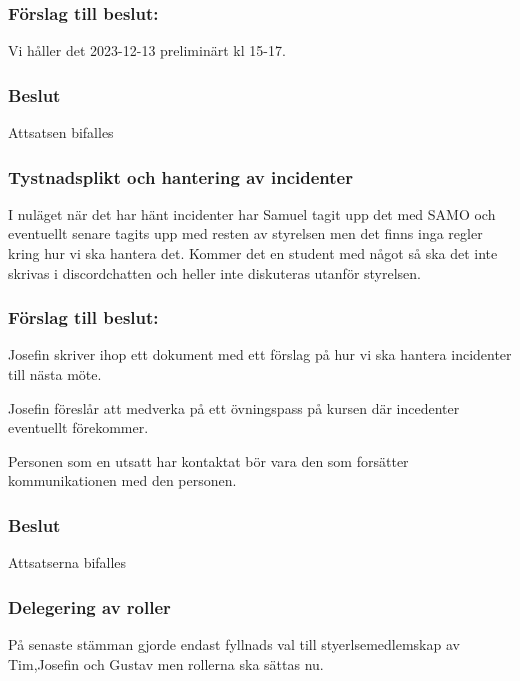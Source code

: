 \documentclass[protokoll]{dvd}
\begin{document}
\subsubsection*{Förslag till beslut:}
\begin{attsatser}
    \item Vi håller det 2023-12-13 preliminärt kl 15-17.
\end{attsatser}

\subsubsection*{Beslut}
\begin{attsatser}
    \item Attsatsen bifalles
\end{attsatser}

\subsubsection*{Tystnadsplikt och hantering av incidenter}
I nuläget när det har hänt incidenter har Samuel tagit upp det med SAMO och eventuellt senare tagits upp med resten av styrelsen men det finns inga regler kring hur vi ska hantera det. 
Kommer det en student med något så ska det inte skrivas i discordchatten och heller inte diskuteras utanför styrelsen.
\subsubsection*{Förslag till beslut:}
\begin{attsatser}
    \item Josefin skriver ihop ett dokument med ett förslag på hur vi ska hantera incidenter till nästa möte.
    \item Josefin föreslår att medverka på ett övningspass på kursen där incedenter eventuellt förekommer.
    \item Personen som en utsatt har kontaktat bör vara den som forsätter kommunikationen med den personen.
\end{attsatser}

\subsubsection*{Beslut}
\begin{attsatser}
    \item Attsatserna bifalles
\end{attsatser}

\subsubsection*{Delegering av roller}
På senaste stämman gjorde endast fyllnads val till styerlsemedlemskap av Tim,Josefin och Gustav men rollerna ska sättas nu.
\end{document}
